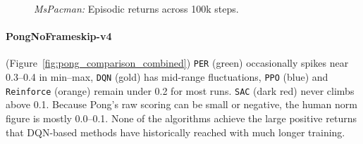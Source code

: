 \begin{figure} 
	\centering
	\quad
	\caption{\emph{MsPacman:} Episodic returns across 100k steps.}
	\label{fig:mspacman_comparison_combined}
\end{figure}

\paragraph{PongNoFrameskip-v4}
(Figure~\ref{fig:pong_comparison_combined})
\texttt{PER} (green) occasionally spikes near 0.3--0.4 in min--max, 
\texttt{DQN} (gold) has mid-range fluctuations, 
\texttt{PPO} (blue) and \texttt{Reinforce} (orange) remain under 0.2 for most runs. 
\texttt{SAC} (dark red) never climbs above 0.1. 
Because Pong's raw scoring can be small or negative, 
the human norm figure is mostly 0.0--0.1. None of the algorithms achieve 
the large positive returns that DQN-based methods have historically 
reached with much longer training.

